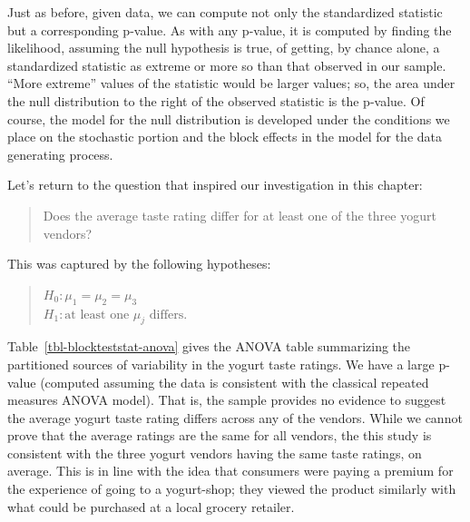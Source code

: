 \documentclass[
  letterpaper,
  DIV=11,
  numbers=noendperiod]{scrreprt}
\theoremstyle{plain}
\theoremstyle{definition}
\theoremstyle{definition}
\theoremstyle{remark}
\begin{document}
Just as before, given data, we can compute not only the standardized
statistic but a corresponding p-value. As with any p-value, it is
computed by finding the likelihood, assuming the null hypothesis is
true, of getting, by chance alone, a standardized statistic as extreme
or more so than that observed in our sample. ``More extreme'' values of
the statistic would be larger values; so, the area under the null
distribution to the right of the observed statistic is the p-value. Of
course, the model for the null distribution is developed under the
conditions we place on the stochastic portion and the block effects in
the model for the data generating process.

Let's return to the question that inspired our investigation in this
chapter:

\begin{quote}
Does the average taste rating differ for at least one of the three
yogurt vendors?
\end{quote}

This was captured by the following hypotheses:

\begin{quote}
\(H_0: \mu_1 = \mu_2 = \mu_3\)\\
\(H_1: \text{at least one } \mu_j \text{ differs}.\)
\end{quote}

Table~\ref{tbl-blockteststat-anova} gives the ANOVA table summarizing
the partitioned sources of variability in the yogurt taste ratings. We
have a large p-value (computed assuming the data is consistent with the
classical repeated measures ANOVA model). That is, the sample provides
no evidence to suggest the average yogurt taste rating differs across
any of the vendors. While we cannot prove that the average ratings are
the same for all vendors, the this study is consistent with the three
yogurt vendors having the same taste ratings, on average. This is in
line with the idea that consumers were paying a premium for the
experience of going to a yogurt-shop; they viewed the product similarly
with what could be purchased at a local grocery retailer.

\begin{table}

\caption{\label{tbl-blockteststat-anova}Analysis of the sources of
variability in the yogurt taste scores as a function of the vendors
while accounting for the repeated measures on the participants.}


\end{table}%
\end{document}
